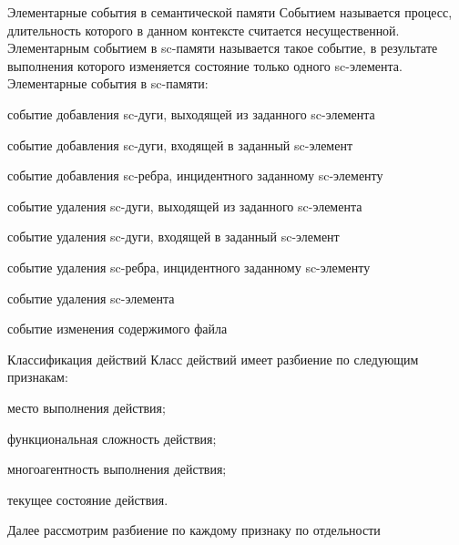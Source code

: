 \begin{frame}{\large Элементарные события в семантической памяти}
\vspace{25}
    Событием называется процесс, длительность которого в данном контексте считается несущественной.\\
    Элементарным событием в sc-памяти называется такое событие, в результате выполнения которого изменяется состояние только одного sc-элемента.
    Элементарные события в sc-памяти:
    \begin{textitemize}
        \item событие добавления sc-дуги, выходящей из заданного sc-элемента
        \item событие добавления sc-дуги, входящей в заданный sc-элемент
        \item событие добавления sc-ребра, инцидентного заданному sc-элементу
        \item событие удаления sc-дуги, выходящей из заданного sc-элемента
        \item событие удаления sc-дуги, входящей в заданный sc-элемент
        \item событие удаления sc-ребра, инцидентного заданному sc-элементу
        \item событие удаления sc-элемента
        \item событие изменения содержимого файла
    \end{textitemize}
\end{frame}

\begin{frame}{Классификация действий}
    Класс действий имеет разбиение по следующим признакам:
\begin{textitemize}
	\item место выполнения действия;
	\item функциональная сложность действия;
	\item многоагентность выполнения действия;
	\item текущее состояние действия.
\end{textitemize}
Далее рассмотрим разбиение по каждому признаку по отдельности
\end{frame}

